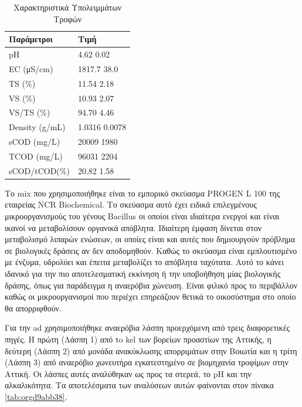 \documentclass[11pt]{report}
\begin{document}
\begin{table}[htbp]
\caption{\label{tab:org4cd19fe}Χαρακτηριστικά Υπολειμμάτων Τροφών}
\centering
\begin{tabular}{ll}
Παράμετροι & Τιμή\\[0pt]
\hline
pH & 4.62 \textpm{} 0.02\\[0pt]
EC (μS/cm) & 1817.7 \textpm{} 38.0\\[0pt]
TS (\%) & 11.54 \textpm{} 2.18\\[0pt]
VS (\%) & 10.93 \textpm{} 2.07\\[0pt]
VS/TS (\%) & 94.70 \textpm{} 4.46\\[0pt]
Density (g/mL) & 1.0316 \textpm{} 0.0078\\[0pt]
sCOD (mg/L) & 20009 \textpm{} 1980\\[0pt]
TCOD (mg/L) & 96031 \textpm{} 2204\\[0pt]
sCOD/tCOD(\%) & 20.82 \textpm{} 1.58\\[0pt]
\end{tabular}
\end{table}

Το \acrfull{mix} που χρησιμοποιήθηκε είναι το εμπορικό σκεύασμα PROGEN L 100 της εταιρείας NCR Biochemical. Το σκεύασμα αυτό έχει ειδικά επιλεγμένους μικροοργανισμούς του γένους Bacillus οι οποίοι είναι ιδιαίτερα ενεργοί και είναι ικανοί να μεταβολίσουν οργανικά απόβλητα. Ιδιαίτερη έμφαση δίνεται στον μεταβολισμό λιπαρών ενώσεων, οι οποίες είναι και αυτές που δημιουργούν πρόβλημα σε βιολογικές δράσεις αν δεν αποδομηθούν. Καθώς το σκεύασμα είναι εμπλουτισμένο με ένζυμα, υδρολύει και έπειτα μεταβολίζει το απόβλητα ταχύτατα. Αυτό το κάνει ιδανικό για την πιο αποτελεσματική εκκίνηση ή την υποβοήθηση μίας βιολογικής δράσης, όπως για παράδειγμα η αναερόβια χώνευση. Είναι φιλικό προς το περιβάλλον καθώς οι μικροοργανισμοί που περιέχει επηρεάζουν θετικά το οικοσύστημα στο οποίο θα απορριφθούν.

Για την \acrshort{ad} χρησιμοποιήθηκε αναερόβια λάσπη προερχόμενη από τρεις διαφορετικές πηγές. Η πρώτη (Λάσπη 1) από τo \acrfull{kel} των βορείων προαστίων της Αττικής, η δεύτερη (Λάσπη 2) από μονάδα ανακύκλωσης απορριμάτων στην Βοιωτία και η τρίτη (Λάσπη 3) από αναερόβιο χωνευτήρα εγκατεστημένο σε βιομηχανία τροφίμων στην Αττική. Οι λάσπες αυτές αναλύθηκαν ως προς τα στερεά, το pH και την αλκαλικότητα. Τα αποτελέσματα των αναλύσεων αυτών φαίνονται στον πίνακα \ref{tab:orgd9abb38}. 
\end{document}
